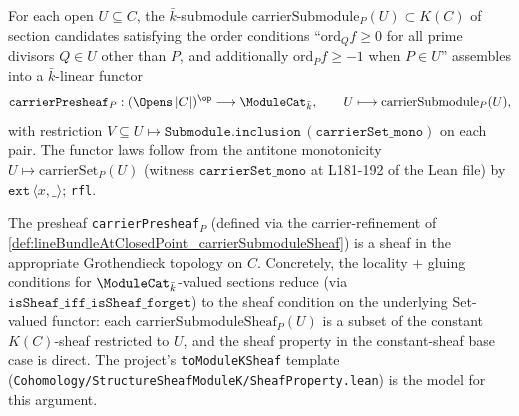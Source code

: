 \begin{definition}

  \label{def:lineBundleAtClosedPoint_carrierPresheaf}
  For each open \(U \subseteq C\), the \(\bar k\)-submodule
  \(\mathrm{carrierSubmodule}_P(U) \subset K(C)\) of section candidates
  satisfying the order conditions ``\(\mathrm{ord}_Q f \ge 0\) for all
  prime divisors \(Q \in U\) other than \(P\), and additionally
  \(\mathrm{ord}_P f \ge -1\) when \(P \in U\)'' assembles into a
  \(\bar k\)-linear functor
  \[
    \texttt{carrierPresheaf}_P : (\Opens\, |C|)^{\op}
    \longrightarrow \ModuleCat_{\bar k},
    \qquad U \longmapsto \mathrm{carrierSubmodule}_P(U),
  \]
  with restriction \(V \subseteq U \mapsto \texttt{Submodule.inclusion}\,
  (\texttt{carrierSet\_mono})\) on each pair. The functor laws follow from
  the antitone monotonicity \(U \mapsto \mathrm{carrierSet}_P(U)\) (witness
  \(\texttt{carrierSet\_mono}\) at L181-192 of the Lean file) by
  \(\texttt{ext}\,\langle x, \_\rangle\); \texttt{rfl}.
\end{definition}

\begin{lemma}

  \label{lem:lineBundleAtClosedPoint_carrierPresheaf_isSheaf}
  The presheaf \texttt{carrierPresheaf}\(_P\) (defined via the
  carrier-refinement of \cref{def:lineBundleAtClosedPoint_carrierSubmoduleSheaf})
  is a sheaf in the appropriate Grothendieck topology on \(C\). Concretely,
  the locality + gluing conditions for \(\ModuleCat_{\bar k}\)-valued sections
  reduce (via \(\texttt{isSheaf\_iff\_isSheaf\_forget}\)) to the sheaf
  condition on the underlying Set-valued functor: each
  \(\mathrm{carrierSubmoduleSheaf}_P(U)\) is a subset of the constant
  \(K(C)\)-sheaf restricted to \(U\), and the sheaf property in the
  constant-sheaf base case is direct. The project's
  \texttt{toModuleKSheaf} template
  (\texttt{Cohomology/StructureSheafModuleK/SheafProperty.lean}) is
  the model for this argument.
\end{lemma}

